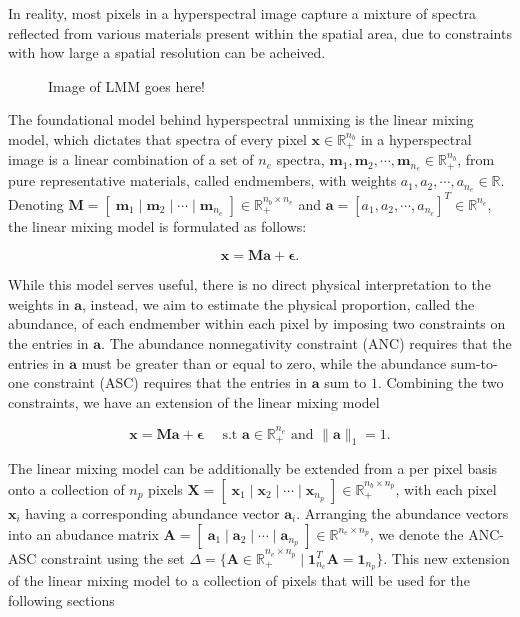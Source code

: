 In reality, most pixels in a hyperspectral image capture a mixture of spectra reflected from various materials present within the spatial area, due to constraints with how large a spatial resolution can be acheived. 

\begin{figure}[h]
    \caption{Image of LMM goes here!}
    \label{fig:figure2}
\end{figure}


The foundational model behind hyperspectral unmixing is the linear mixing model, which dictates that spectra of every pixel $\mathbf{x} \in \mathbb{R}_+^{n_b}$ in a hyperspectral image is a linear combination of a set of $n_e$ spectra, $\mathbf{m} _1, \mathbf{m} _2, \cdots, \mathbf{m} _{n_e} \in \mathbb{R}_+^{n_b}$, from pure representative materials, called endmembers, with weights $a_1, a_2, \cdots, a_{n_e} \in \mathbb{R}$. Denoting $\mathbf{M} = [\;\mathbf{m} _1 \;|\; \mathbf{m} _2 \;|\; \cdots \;|\; \mathbf{m} _{n_e}\;] \in \mathbb{R}_+^{n_b \times n_e}$ and $\mathbf{a} = [a_1, a_2, \cdots ,a_{n_e}]^T \in \mathbb{R}^{n_e}$, the linear mixing model is formulated as follows:

\begin{equation}
    \label{lmm:model}
    \mathbf{x} = \mathbf{M} \mathbf{a} + \mathbf{\epsilon}.
\end{equation}

While this model serves useful, there is no direct physical interpretation to the weights in $\mathbf{a}$, instead, we aim to estimate the physical proportion, called the abundance, of each endmember within each pixel by imposing two constraints on the entries in $\mathbf{a}$. The abundance nonnegativity constraint (ANC) requires that the entries in $\mathbf{a}$ must be greater than or equal to zero, while the abundance sum-to-one constraint (ASC) requires that the entries in $\mathbf{a}$ sum to $1$. Combining the two constraints, we have an extension of the linear mixing model

\begin{equation}
    \label{lmm:abund-lmm}
    \mathbf{x} = \mathbf{M} \mathbf{a} + \mathbf{\epsilon} \quad \text{ s.t } \mathbf{a} \in \mathbb{R}_+^{n_e} \text{ and } \|\mathbf{a}\|_1 = 1.
\end{equation}

The linear mixing model can be additionally be extended from a per pixel basis onto a collection of $n_p$ pixels $\mathbf{X} = [\;\mathbf{x}_1 \;|\; \mathbf{x}_2 \;|\; \cdots \;|\; \mathbf{x}_{n_p}\;] \in \mathbb{R}_ +^{n_b \times n_p}$, with each pixel $\mathbf{x}_i$ having a corresponding abundance vector $\mathbf{a}_i$. Arranging the abundance vectors into an abudance matrix $\mathbf{A} = [\;\mathbf{a}_1 \;|\; \mathbf{a}_2 \;|\; \cdots \;|\; \mathbf{a}_{n_p} \;] \in \mathbb{R}^{n_e \times n_p}$, we denote the ANC-ASC constraint using the set $ \Delta = \{ \mathbf{A} \in \mathbb{R}_+^{n_e \times n_p} \mid \mathbf{1}_{n_e}^T \mathbf{A} = \mathbf{1}_{n_p}\} $. This new extension of the linear mixing model to a collection of pixels that will be used for the following sections


